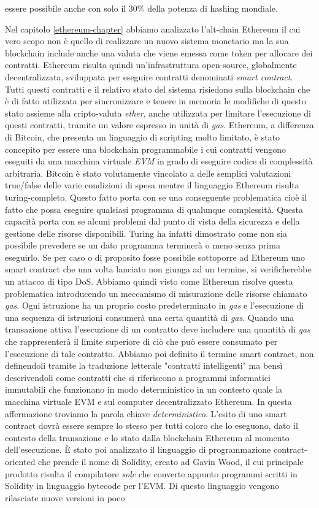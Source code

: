 essere possibile anche con solo il 30\% della potenza di hashing mondiale.

Nel capitolo \ref{ethereum-chapter} abbiamo analizzato l'alt-chain Ethereum il cui vero scopo non è quello di realizzare un nuovo sistema monetario ma la sua blockchain include anche una valuta che viene emessa come token per allocare dei contratti. Ethereum risulta quindi un'infrastruttura open-source, globalmente decentralizzata, sviluppata per eseguire contratti denominati \textit{smart contract}. Tutti questi contratti e il relativo stato del sistema risiedono sulla blockchain che è di fatto utilizzata per sincronizzare e tenere in memoria le modifiche di questo stato assieme alla cripto-valuta \textit{ether}, anche utilizzata per limitare l'esecuzione di questi contratti, tramite un valore espresso in unità di \textit{gas}. Ethereum, a differenza di Bitcoin, che presenta un linguaggio di scripting molto limitato, è stato concepito per essere una blockchain programmabile i cui contratti vengono eseguiti da una macchina virtuale \textit{EVM} in grado di eseguire codice di complessità arbitraria. Bitcoin è stato volutamente vincolato a delle semplici valutazioni true/false delle varie condizioni di spesa mentre il linguaggio Ethereum risulta turing-completo. Questo fatto porta con se una conseguente problematica cioè il fatto che possa eseguire qualsiasi programma di qualunque complessità. Questa capacità porta con se alcuni problemi dal punto di vista della sicurezza e della gestione delle risorse disponibili. Turing ha infatti dimostrato come non sia possibile prevedere se un dato programma terminerà o meno senza prima eseguirlo. Se per caso o di proposito fosse possibile sottoporre ad Ethereum uno smart contract che una volta lanciato non giunga ad un termine, si verificherebbe un attacco di tipo DoS. Abbiamo quindi visto come Ethereum risolve questa problematica introducendo un meccanismo di misurazione delle risorse chiamato \textit{gas}. Ogni istruzione ha un proprio costo predeterminato in \textit{gas} e l'esecuzione di una sequenza di istruzioni consumerà una certa quantità di \textit{gas}. Quando una transazione attiva l'esecuzione di un contratto deve includere una quantità di \textit{gas} che rappresenterà il limite superiore di ciò che può essere consumato per l'esecuzione di tale contratto. Abbiamo poi definito il termine smart contract, non definendoli tramite la traduzione letterale "contratti intelligenti" ma bensì descrivendoli come contratti che si riferiscono a programmi informatici immutabili che funzionano in modo deterministico in un contesto quale la macchina virtuale EVM e sul computer decentralizzato Ethereum. In questa affermazione troviamo la parola chiave \textit{deterministico}. L'esito di uno smart contract dovrà essere sempre lo stesso per tutti coloro che lo eseguono, dato il contesto della transazione e lo stato dalla blockchain Ethereum al momento dell'esecuzione. \`E stato poi analizzato il linguaggio di programmazione contract-oriented che prende il nome di Solidity, creato ad Gavin Wood, il cui principale prodotto risulta il compilatore \textit{solc} che converte appunto programmi scritti in Solidity in linguaggio bytecode per l'EVM. Di questo linguaggio vengono rilasciate nuove versioni in poco 